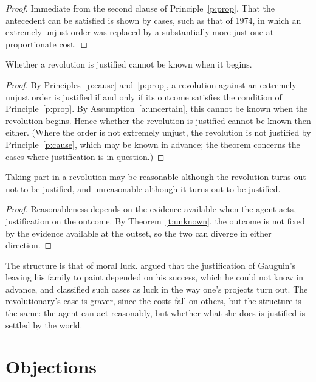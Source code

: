 \documentclass{situationist-preprint}
\begin{document}
\begin{proof}
Immediate from the second clause of Principle~\ref{p:prop}. That the antecedent can be satisfied is shown by cases, such as that of 1974, in which an extremely unjust order was replaced by a substantially more just one at proportionate cost.
\end{proof}

\begin{theorem}\label{t:unknown}
Whether a revolution is justified cannot be known when it begins.
\end{theorem}

\begin{proof}
By Principles~\ref{p:cause} and~\ref{p:prop}, a revolution against an extremely unjust order is justified if and only if its outcome satisfies the condition of Principle~\ref{p:prop}. By Assumption~\ref{a:uncertain}, this cannot be known when the revolution begins. Hence whether the revolution is justified cannot be known then either. (Where the order is not extremely unjust, the revolution is not justified by Principle~\ref{p:cause}, which may be known in advance; the theorem concerns the cases where justification is in question.)
\end{proof}

\begin{corollary}\label{c:reasonable}
Taking part in a revolution may be reasonable although the revolution turns out not to be justified, and unreasonable although it turns out to be justified.
\end{corollary}

\begin{proof}
Reasonableness depends on the evidence available when the agent acts, justification on the outcome. By Theorem~\ref{t:unknown}, the outcome is not fixed by the evidence available at the outset, so the two can diverge in either direction.
\end{proof}

The structure is that of moral luck. \citet{Williams1981} argued that the justification of Gauguin's leaving his family to paint depended on his success, which he could not know in advance, and \citet{Nagel1979} classified such cases as luck in the way one's projects turn out. The revolutionary's case is graver, since the costs fall on others, but the structure is the same: the agent can act reasonably, but whether what she does is justified is settled by the world.

\section{Objections}
\end{document}
